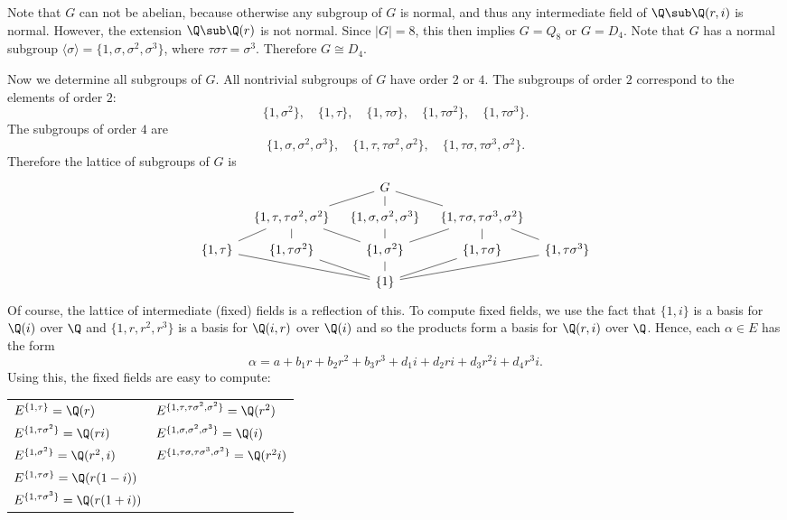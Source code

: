 \begin{example}
Note that $G$ can not be abelian, because otherwise any subgroup of $G$ is normal, and thus any intermediate field of $\Q\sub\Q(r,i)$ is normal. However, the extension $\Q\sub\Q(r)$ is not normal. Since $|G|=8$, this then implies $G=Q_8$ or $G=D_4$. Note that $G$ has a normal subgroup $\langle\sigma\rangle=\{1,\sigma,\sigma^2,\sigma^3\}$, where $\tau\sigma\tau=\sigma^3$. Therefore $G\cong D_4$.\par
Now we determine all subgroups of $G$. All nontrivial subgroups of $G$ have order $2$ or $4$. The subgroups of order $2$ correspond to the elements of order $2$:
\[\{1,\sigma^2\},\quad\{1,\tau\},\quad\{1,\tau\sigma\},\quad\{
1,\tau\sigma^2\},\quad\{1,\tau\sigma^3\}.\]
The subgroups of order $4$ are
\[\{1,\sigma,\sigma^2,\sigma^3\},\quad\{1,\tau,\tau\sigma^2,\sigma^2\},\quad\{1,\tau\sigma,\tau\sigma^3,\sigma^2\}.\]
Therefore the lattice of subgroups of $G$ is
\[\begin{tikzcd}[row sep=8pt,column sep=8pt]
&&G\ar[d,no head]\ar[rd,no head]\ar[ld,no head]&&\\
&\{1,\tau,\tau\sigma^2,\sigma^2\}\ar[d,no head]\ar[rd,no head]\ar[ld,no head]&\{1,\sigma,\sigma^2,\sigma^3\}\ar[d,no head]&\{1,\tau\sigma,\tau\sigma^3,\sigma^2\}\ar[d,no head]\ar[rd,no head]\ar[ld,no head]&\\
\{1,\tau\}&\{1,\tau\sigma^2\}&\{1,\sigma^2\}&\{1,\tau\sigma\}&\{1,\tau\sigma^3\}\\
&&\{1\}\ar[u,no head]\ar[ru,no head]\ar[rru,no head]\ar[lu,no head]\ar[llu,no head]&&
\end{tikzcd}\]
Of course, the lattice of intermediate (fixed) fields is a reflection of this. To compute fixed fields, we use the fact that $\{1,i\}$ is a basis for $\Q(i)$ over $\Q$ and $\{1,r,r^2,r^3\}$ is a basis for $\Q(i,r)$ over $\Q(i)$ and so the products form a basis for $\Q(r,i)$ over $\Q$. Hence, each $\alpha\in E$ has the form
\[\alpha=a+b_1r+b_2r^2+b_3r^3+d_1i+d_2ri+d_3r^2i+d_4r^3i.\]
Using this, the fixed fields are easy to compute:
\begin{table}[htbp]
\renewcommand\arraystretch{1.3}
\centering
\begin{tabular}{l|l}
\hline
$E^{\{1,\tau\}}=\Q(r)$&$E^{\{1,\tau,\tau\sigma^2,\sigma^2\}}=\Q(r^2)$\\
$E^{\{1,\tau\sigma^2\}}=\Q(ri)$&$E^{\{1,\sigma,\sigma^2,\sigma^3\}}=\Q(i)$\\
$E^{\{1,\sigma^2\}}=\Q(r^2,i)$&$E^{\{1,\tau\sigma,\tau\sigma^3,\sigma^2\}}=\Q(r^2i)$\\
$E^{\{1,\tau\sigma\}}=\Q(r(1-i))$&\\
$E^{\{1,\tau\sigma^3\}}=\Q(r(1+i))$&\\
\hline
\end{tabular}
\end{table}


\end{example}
